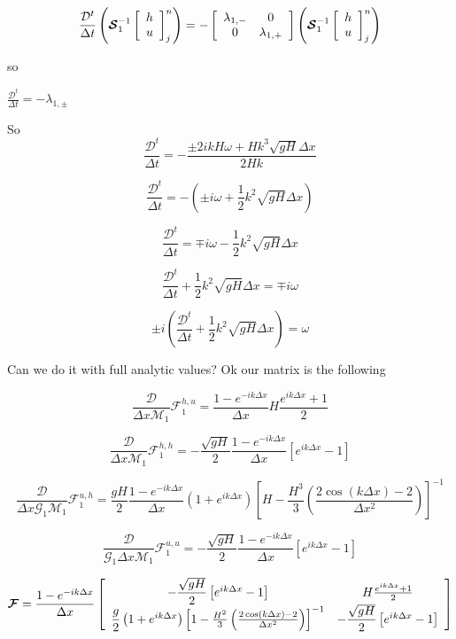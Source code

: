 \documentclass[12pt]{article}
\begin{document}
\[\frac{\mathcal{D}^t}{\Delta t}\left( \boldsymbol{\mathcal{S}}_1^{-1}\left[\begin{array}{c}
h \\ u
\end{array}\right]^{n}_j \right) = -  \left[\begin{array}{c c}
\lambda_{1,-}  & 0 \\0  & \lambda_{1,+}
\end{array}\right] \left( \boldsymbol{\mathcal{S}}_1^{-1}\left[\begin{array}{c}
h \\ u
\end{array}\right]^{n}_j \right) \]

so 

$\frac{\mathcal{D}^t}{\Delta t} = - \lambda_{1,\pm} $

So 
\[\frac{\mathcal{D}^t}{\Delta t} = - \frac{\pm2ikH\omega + Hk^3\sqrt{gH} \Delta x}{2Hk} \]

\[\frac{\mathcal{D}^t}{\Delta t} = - (\pm i\omega + \frac{1}{2}k^2\sqrt{gH} \Delta x) \]

\[\frac{\mathcal{D}^t}{\Delta t} = \mp i\omega - \frac{1}{2}k^2\sqrt{gH} \Delta x \]

\[\frac{\mathcal{D}^t}{\Delta t} + \frac{1}{2}k^2\sqrt{gH} \Delta x = \mp i\omega \]

\[\pm i\left(\frac{\mathcal{D}^t}{\Delta t} + \frac{1}{2}k^2\sqrt{gH} \Delta x\right) = \omega \]

Can we do it with full analytic values? Ok our matrix is the following

\[\frac{\mathcal{D}}{\Delta x\mathcal{M}_1}\mathcal{F}^{h,u}_1 = \frac{1 -e^{-ik\Delta x}}{\Delta x} H \frac{e^{ik\Delta x } + 1}{2}\]


\[\frac{\mathcal{D}}{\Delta x\mathcal{M}_1}\mathcal{F}^{h,h}_1 = -\dfrac{ \sqrt{gH}}{ 2} \frac{1 -e^{-ik\Delta x}}{\Delta x} \left [ e^{ik\Delta x}- 1 \right ]\]

\[\frac{\mathcal{D}}{\Delta x \mathcal{G}_1 \mathcal{M}_1}\mathcal{F}^{u,h}_1 = \dfrac{ gH}{ 2}\frac{1 -e^{-ik\Delta x}}{\Delta x} \left(1 + e^{ik\Delta x}\right) \left[H - \frac{H^3}{3}\left(\frac{ 2\cos\left(k\Delta x\right) - 2 }{\Delta x^2}\right) \right]^{-1}\]


\[\frac{\mathcal{D}}{\mathcal{G}_1\Delta x\mathcal{M}_1}\mathcal{F}^{u,u}_1 = - \dfrac{ \sqrt{gH}}{ 2}\frac{1 -e^{-ik\Delta x}}{\Delta x} \left [ e^{ik\Delta x}  -  1  \right ]\]


\[\boldsymbol{\mathcal{F}} = \frac{1 -e^{-ik\Delta x}}{\Delta x}\left[\begin{array}{c c}
 -\dfrac{ \sqrt{gH}}{ 2} \left [ e^{ik\Delta x}- 1 \right ]& H \frac{e^{ik\Delta x } + 1}{2} \\\dfrac{ g}{ 2} \left(1 + e^{ik\Delta x}\right) \left[1 - \frac{H^2}{3}\left(\frac{ 2\cos\left(k\Delta x\right) - 2 }{\Delta x^2}\right) \right]^{-1}   &  - \dfrac{ \sqrt{gH}}{ 2} \left [ e^{ik\Delta x}  -  1  \right ]  
\end{array}\right]   \]
\end{document}
